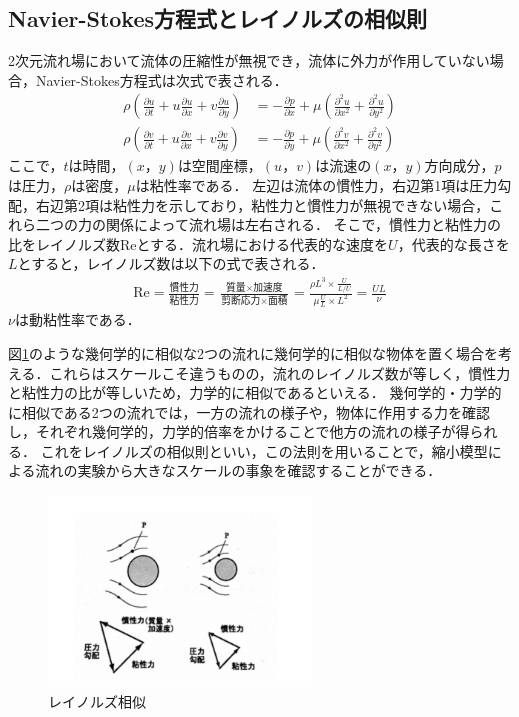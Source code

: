 \documentclass[a4paper,11pt,uplatex]{jsarticle}
\begin{document}
\subsection{Navier-Stokes方程式とレイノルズの相似則}
2次元流れ場において流体の圧縮性が無視でき，流体に外力が作用していない場合，Navier-Stokes方程式は次式で表される．
\begin{align}
  \rho \left( \frac{\partial u}{\partial t} + u\frac{\partial u}{\partial x} + v\frac{\partial u}{\partial y} \right) &= -\frac{\partial p}{\partial x} + \mu \left( \frac{\partial^2 u}{\partial x^2} + \frac{\partial^2 u}{\partial y^2} \right) \\
  \rho \left( \frac{\partial v}{\partial t} + u\frac{\partial v}{\partial x} + v\frac{\partial v}{\partial y} \right) &= -\frac{\partial p}{\partial y} + \mu \left( \frac{\partial^2 v}{\partial x^2} + \frac{\partial^2 v}{\partial y^2} \right)
\end{align}
ここで，$t$は時間，$(x，y)$は空間座標，$(u，v)$は流速の$(x，y)$方向成分，$p$は圧力，$\rho$は密度，$\mu$は粘性率である．
左辺は流体の慣性力，右辺第1項は圧力勾配，右辺第2項は粘性力を示しており，粘性力と慣性力が無視できない場合，これら二つの力の関係によって流れ場は左右される．
そこで，慣性力と粘性力の比をレイノルズ数Reとする．流れ場における代表的な速度を$U$，代表的な長さを$L$とすると，レイノルズ数は以下の式で表される．
\begin{align}
  \label{レイノルズ数}
  \mathrm{Re} = \frac{\mbox{慣性力}}{\mbox{粘性力}} = \frac{\mbox{質量} \times \mbox{加速度}}{\mbox{剪断応力} \times \mbox{面積}} = \frac{\rho L^3 \times \frac{U}{L/U}}{\mu \frac{U}{L} \times L^2} = \frac{UL}{\nu}
\end{align}
$\nu$は動粘性率である．
\par
図\ref{レイノルズ}のような幾何学的に相似な2つの流れに幾何学的に相似な物体を置く場合を考える．\cite{s2}これらはスケールこそ違うものの，流れのレイノルズ数が等しく，慣性力と粘性力の比が等しいため，力学的に相似であるといえる．
幾何学的・力学的に相似である2つの流れでは，一方の流れの様子や，物体に作用する力を確認し，それぞれ幾何学的，力学的倍率をかけることで他方の流れの様子が得られる．
これをレイノルズの相似則といい，この法則を用いることで，縮小模型による流れの実験から大きなスケールの事象を確認することができる．


\begin{figure}[H]
  \begin{center}
    \includegraphics[width = 7cm]{pic/reinolz.png}
    \caption{レイノルズ相似}
    \label{レイノルズ}
  \end{center}
\end{figure}
\end{document}
